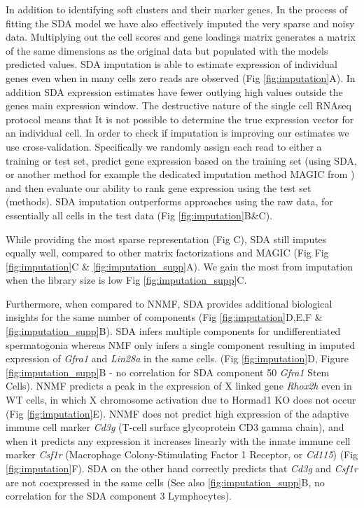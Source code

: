 In addition to identifying soft clusters and their marker genes, In the process of fitting the SDA model we have also effectively imputed the very sparse and noisy data. Multiplying out the cell scores and gene loadings matrix generates a matrix of the same dimensions as the original data but populated with the models predicted values. SDA imputation is able to estimate expression of individual genes even when in many cells zero reads are observed (Fig \ref{fig:imputation}A). In addition SDA expression estimates have fewer outlying high values outside the genes main expression window. The destructive nature of the single cell RNAseq protocol means that It is not possible to determine the true expression vector for an individual cell. In order to check if imputation is improving our estimates we use cross-validation. Specifically we randomly assign each read to either a training or test set, predict gene expression based on the training set (using SDA, or another method for example the dedicated imputation method MAGIC from \cite{vanDijk2018Recovering}) and then evaluate our ability to rank gene expression using the test set (methods). SDA imputation outperforms approaches using the raw data, for essentially all cells in the test data (Fig \ref{fig:imputation}B\&C).

While providing the most sparse representation (Fig \label{fig:imputation}C), SDA still imputes equally well, compared to other matrix factorizations and MAGIC \parencite{vanDijk2018Recovering} (Fig Fig \ref{fig:imputation}C \& \ref{fig:imputation_supp}A). We gain the most from imputation when the library size is low Fig \ref{fig:imputation_supp}C.

Furthermore, when compared to NNMF, SDA provides additional biological insights for the same number of components (Fig \ref{fig:imputation}D,E,F \& \ref{fig:imputation_supp}B). SDA infers multiple components for undifferentiated spermatogonia whereas NMF only infers a single component resulting in imputed expression of \textit{Gfra1} and \textit{Lin28a} in the same cells. (Fig \ref{fig:imputation}D, Figure \ref{fig:imputation_supp}B - no correlation for SDA component 50 \textit{Gfra1} Stem Cells). NNMF predicts a peak in the expression of X linked gene \textit{Rhox2h} even in WT cells, in which X chromosome activation due to Hormad1 KO does not occur (Fig \ref{fig:imputation}E). NNMF does not predict high expression of the adaptive immune cell marker \textit{Cd3g} (T-cell surface glycoprotein CD3 gamma chain), and when it predicts any expression it increases linearly with the innate immune cell marker \textit{Csf1r} (Macrophage Colony-Stimulating Factor 1 Receptor, or \textit{Cd115}) (Fig \ref{fig:imputation}F). SDA on the other hand correctly predicts that \textit{Cd3g} and \textit{Csf1r} are not coexpressed in the same cells (See also \ref{fig:imputation_supp}B, no correlation for the SDA component 3 Lymphocytes).

